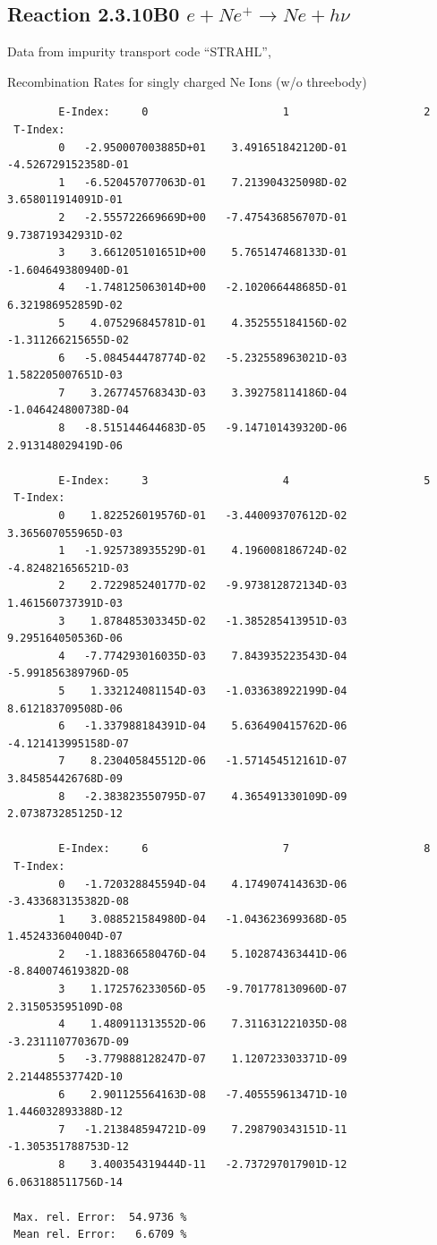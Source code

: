 \documentclass[12pt,dvips]{article}
\begin{document}
\subsection{
Reaction 2.3.10B0   $e + Ne^+ \rightarrow  Ne + h\nu$ }

Data from impurity transport code ``STRAHL'', \cite{kn:Behringer}

  Recombination Rates for singly charged Ne Ions (w/o threebody)



\begin{small}\begin{verbatim}
        E-Index:     0                     1                     2
 T-Index:
        0   -2.950007003885D+01    3.491651842120D-01   -4.526729152358D-01
        1   -6.520457077063D-01    7.213904325098D-02    3.658011914091D-01
        2   -2.555722669669D+00   -7.475436856707D-01    9.738719342931D-02
        3    3.661205101651D+00    5.765147468133D-01   -1.604649380940D-01
        4   -1.748125063014D+00   -2.102066448685D-01    6.321986952859D-02
        5    4.075296845781D-01    4.352555184156D-02   -1.311266215655D-02
        6   -5.084544478774D-02   -5.232558963021D-03    1.582205007651D-03
        7    3.267745768343D-03    3.392758114186D-04   -1.046424800738D-04
        8   -8.515144644683D-05   -9.147101439320D-06    2.913148029419D-06

        E-Index:     3                     4                     5
 T-Index:
        0    1.822526019576D-01   -3.440093707612D-02    3.365607055965D-03
        1   -1.925738935529D-01    4.196008186724D-02   -4.824821656521D-03
        2    2.722985240177D-02   -9.973812872134D-03    1.461560737391D-03
        3    1.878485303345D-02   -1.385285413951D-03    9.295164050536D-06
        4   -7.774293016035D-03    7.843935223543D-04   -5.991856389796D-05
        5    1.332124081154D-03   -1.033638922199D-04    8.612183709508D-06
        6   -1.337988184391D-04    5.636490415762D-06   -4.121413995158D-07
        7    8.230405845512D-06   -1.571454512161D-07    3.845854426768D-09
        8   -2.383823550795D-07    4.365491330109D-09    2.073873285125D-12

        E-Index:     6                     7                     8
 T-Index:
        0   -1.720328845594D-04    4.174907414363D-06   -3.433683135382D-08
        1    3.088521584980D-04   -1.043623699368D-05    1.452433604004D-07
        2   -1.188366580476D-04    5.102874363441D-06   -8.840074619382D-08
        3    1.172576233056D-05   -9.701778130960D-07    2.315053595109D-08
        4    1.480911313552D-06    7.311631221035D-08   -3.231110770367D-09
        5   -3.779888128247D-07    1.120723303371D-09    2.214485537742D-10
        6    2.901125564163D-08   -7.405559613471D-10    1.446032893388D-12
        7   -1.213848594721D-09    7.298790343151D-11   -1.305351788753D-12
        8    3.400354319444D-11   -2.737297017901D-12    6.063188511756D-14

 Max. rel. Error:  54.9736 %
 Mean rel. Error:   6.6709 %

\end{verbatim}\end{small}
\end{document}
